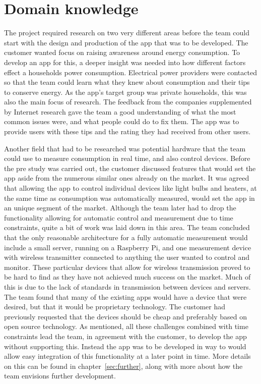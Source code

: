 \section{Domain knowledge}
The project required research on two very different areas before the team could start with the design and production of the app that was to be developed. The customer wanted focus on raising awareness around energy consumption. To develop an app for this, a deeper insight was needed into how different factors effect a households  power consumption. Electrical power providers were contacted so that the team could learn what they knew about consumption and their tips to conserve energy. As the app's target group was private households, this was also the main focus of research. The feedback from the companies supplemented by Internet research gave the team a good understanding of what the most common issues were, and what people could do to fix them. The app was to provide users with these tips and the rating they had received from other users. 

Another field that had to be researched was potential hardware that the team could use to measure consumption in real time, and also control devices. Before the pre study was carried out, the customer discussed features that would set the app aside from the numerous similar ones already on the market. It was agreed that allowing the app to control individual devices like light bulbs and heaters, at the same time as consumption was automatically measured, would set the app in an unique segment of the market. Although the team later had to drop the functionality allowing for automatic control and measurement due to time constraints, quite a bit of work was laid down in this area. The team concluded that the only reasonable architecture for a fully automatic measurement would include a small server, running on a Raspberry Pi, and one measurement device with wireless transmitter connected to anything the user wanted to control and monitor. These particular devices that allow for wireless transmission proved to be hard to find as they have not achieved much success on the market. Much of this is due to the lack of standards in transmission between devices and servers. The team found that many of the existing apps would have a device that were desired, but that it would be proprietary technology. The customer had previously requested that the devices should be cheap and preferably based on open source technology. As mentioned, all these challenges combined with time constraints lead the team, in agreement with the customer, to develop the app without supporting this. Instead the app was to be developed in way to would allow easy integration of this functionality at a later point in time. More details on this can be found in chapter~\ref{sec:further}, along with more about how the team envisions further development. 